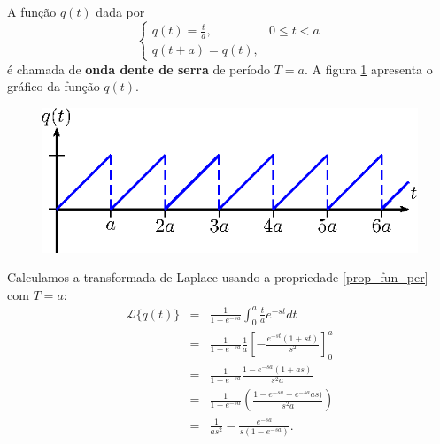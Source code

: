 \begin{ex} A função $q(t)$ dada por
\begin{equation}
\left\{\begin{array}{ll}q(t)=\frac{t}{a},&0\leq t<a\\ q\left(t+a\right)=q(t), & \end{array}\right.
\end{equation}
é chamada de {\bf onda dente de serra} de período $T=a$. A figura \ref{fig_dente_de_serra} apresenta o gráfico da função $q(t)$.
 \begin{figure}[!ht]
\begin{center}

\includegraphics{cap_especiais_coef_var/pics/figura_5}\end{center}
\caption{\label{fig_dente_de_serra}}
\end{figure}
Calculamos a transformada de Laplace usando a propriedade \ref{prop_fun_per} com $T=a$:
\begin{eqnarray*}
\mathcal{L}\{q(t)\}&=& \frac{1}{1-e^{-sa}} \int_0^{a} \frac{t}{a} e^{-st}dt\\
&=&\frac{1}{1-e^{-sa}}\frac{1}{a}\left[ -\frac{e^{-s t} (1+s t)}{s^2}\right]_0^a\\
&=&\frac{1}{1-e^{-sa}}\frac{1-e^{-sa}(1+as)}{s^2a} \\
&=&\frac{1}{1-e^{-sa}}\left(\frac{1-e^{-sa}-e^{-sa} as)}{s^2a} \right)\\
&=&\frac{1}{as^2}-\frac{e^{-sa} }{s\left(1-e^{-sa}\right)}.
\end{eqnarray*}
\end{ex}

